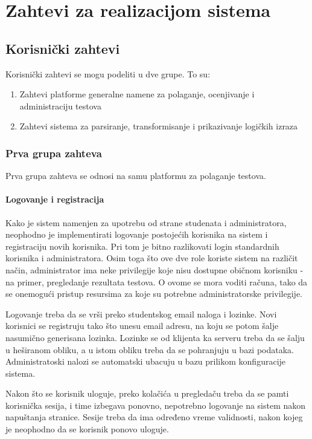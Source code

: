 \chapter{Zahtevi za realizacijom sistema}\label{zahtevi}
\section{Korisnički zahtevi}
Korisnički zahtevi se mogu podeliti u dve grupe. To su:
\begin{enumerate}
\item Zahtevi platforme generalne namene za polaganje, ocenjivanje i administraciju testova
\item Zahtevi sistema za parsiranje, transformisanje i prikazivanje logičkih izraza
\end{enumerate}
\subsection{Prva grupa zahteva}
Prva grupa zahteva se odnosi na samu platformu za polaganje testova. \subsubsection{Logovanje i registracija}
Kako je sistem namenjen za upotrebu od strane studenata i administratora, neophodno je implementirati logovanje postojećih korisnika na sistem i registraciju novih korisnika. Pri tom je bitno razlikovati login standardnih korisnika i administratora. Osim toga što ove dve role koriste sistem na različit način, administrator ima neke privilegije koje nisu dostupne običnom korisniku - na primer, pregledanje rezultata testova. O ovome se mora voditi računa, tako da se onemogući pristup resursima za koje su potrebne administratorske privilegije.

Logovanje treba da se vrši preko studentskog email naloga i lozinke. Novi korisnici se registruju tako što unesu email adresu, na koju se potom šalje nasumično generisana lozinka. Lozinke se od klijenta ka serveru treba da se šalju u heširanom obliku, a u istom obliku treba da se pohranjuju u bazi podataka. Administratoski nalozi se automatski ubacuju u bazu prilikom konfiguracije sistema.

Nakon što se korisnik uloguje, preko kolačića u pregledaču treba da se pamti korisnička sesija, i time izbegava ponovno, nepotrebno logovanje na sistem nakon napuštanja stranice. Sesije treba da ima određeno vreme validnosti, nakon kojeg je neophodno da se korisnik ponovo uloguje.

